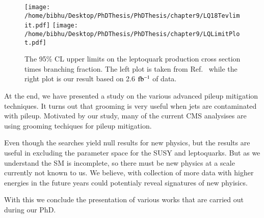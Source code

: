 \begin{figure}[h]
\centering
\texttt{[image: /home/bibhu/Desktop/PhDThesis/PhDThesis/chapter9/LQ18Tevlimit.pdf]}
\texttt{[image: /home/bibhu/Desktop/PhDThesis/PhDThesis/chapter9/LQLimitPlot.pdf]}
\caption{\label{fig:LQLimit8TeV13TeV}The 95\% CL upper limits on the leptoquark production cross section times branching fraction. The left plot is taken from Ref.~\cite{CMS-PAS-EXO-12-041} while the right plot is our result based on 2.6 $\rm fb^{-1}$ of data.}
\end{figure}


At the end, we have presented a study on the various advanced pileup mitigation techniques. It turns out that grooming is very useful when jets are contaminated with pileup. Motivated by our study, many of the current CMS analysises are using grooming techiques for pileup mitigation.

Even though the searches yield null results for new physics, but the results are useful in excluding the parameter space for the SUSY and leptoquarks. But as we understand the SM is incomplete, so there must be new physics at a scale currently not known to us. We believe, with collection of more data with higher energies in the future years could potentialy reveal signatures of new phyisics.  

With this we conclude the presentation of various works that are carried out during our PhD.
































